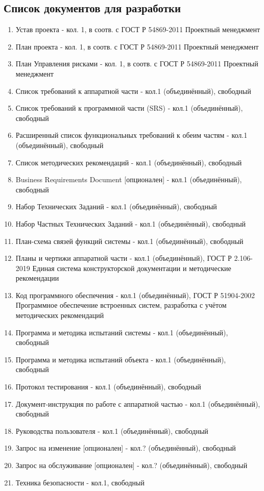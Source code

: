 \documentclass[16pt,a4paper]{article}
\begin{document}
\subsection{Список документов для разработки}
\begin{enumerate}
    \item Устав проекта - кол. 1, в соотв. с ГОСТ Р 54869-2011 Проектный менеджмент
    \item План проекта - кол. 1, в соотв. с ГОСТ Р 54869-2011 Проектный менеджмент
    \item План Управления рисками - кол. 1, в соотв. с ГОСТ Р 54869-2011 Проектный менеджмент
    \item Список требований к аппаратной части - кол.1 (объединённый), свободный
    \item Список требований к программной части (SRS) - кол.1 (объединённый), свободный
    \item Расширенный список функциональных требований к обеим частям - кол.1 (объединённый), свободный
    \item Список методических рекомендаций - кол.1 (объединённый), свободный
    \item Business Requirements Document [опционален]  - кол.1 (объединённый), свободный
    \item Набор Технических Заданий - кол.1 (объединённый), свободный
    \item Набор Частных Технических Заданий - кол.1 (объединённый), свободный
    \item План-схема связей функций системы - кол.1 (объединённый), свободный
    \item Планы и чертижи аппаратной части  - кол.1 (объединённый), ГОСТ Р 2.106-2019 Единая система конструкторской документации и методические рекомендации
    \item Код программного обеспечения  - кол.1 (объединённый), ГОСТ Р 51904-2002 Программное обеспечение встроенных систем, разработка с учётом методических рекомендаций 
    \item Программа и методика испытаний системы - кол.1 (объединённый), свободный
    \item Программа и методика испытаний объекта - кол.1 (объединённый), свободный
    \item Протокол тестирования - кол.1 (объединённый), свободный
    \item Документ-инструкция по работе с аппаратной частью - кол.1 (объединённый), свободный
    \item Руководства пользователя - кол.1 (объединённый), свободный
    \item Запрос на изменение [опционален] - кол.? (объединённый), свободный
    \item Запрос на обслуживание [опционален] - кол.? (объединённый), свободный
    \item Техника безопасности - кол.1, свободный
\end{enumerate}
\end{document}
